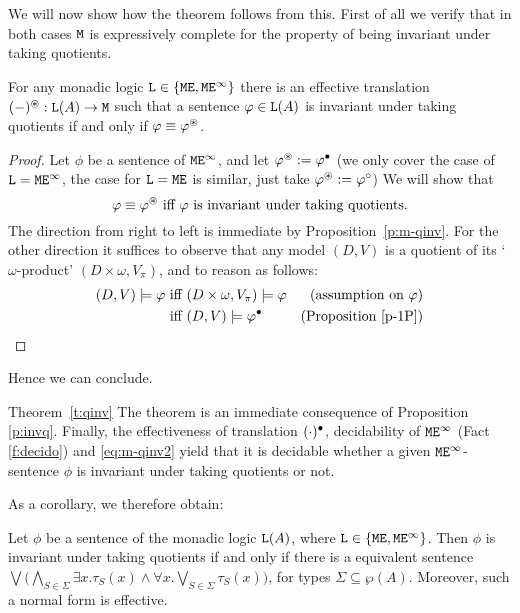 \noindent
We will now show how the theorem follows from this.
First of all we verify that  in both cases $\mathtt{M}$ is expressively complete
for the property of being invariant under taking quotients.

\begin{proposition} 
\label{p:invq}
For any monadic logic $\mathtt{L} \in \{ \mathtt{M}\mathtt{E}, \mathtt{M}\mathtt{E}^{\infty} \}$ there is an effective 
translation $(-)^\oast: \mathtt{L}(A) \to \mathtt{M}$ such that a sentence $\varphi \in
\mathtt{L}(A)$ is invariant under taking quotients if and only if
$\varphi\equiv \varphi^\oast$.
\end{proposition}
\begin{proof}
Let $\phi$ be a sentence of $\mathtt{M}\mathtt{E}^{\infty}$, and let $\varphi^\oast \mathrel{:=} \varphi^{\bullet}$ (we only cover the case of $\mathtt{L} = 
\mathtt{M}\mathtt{E}^{\infty}$, the case for $\mathtt{L} = \mathtt{M}\mathtt{E}$ is similar, just take $\varphi^\oast \mathrel{:=} \varphi^{\circ}$)
We will show that 
\begin{equation}
\label{eq:m-qinv2}
\varphi \equiv \varphi^{\oast} \text{ iff } \text{$\varphi$ is invariant under 
taking quotients}.
\end{equation}
The direction from right to left is immediate by Proposition~\ref{p:m-qinv}.
For the other direction it suffices to observe that any model $(D,V)$ is a 
quotient of its `$\omega$-product' $(D\times \omega, V_\pi)$, and to 
reason as follows:
\begin{align*}
(D,V) \models \varphi 
   & \text{ iff } (D\times \omega, V_\pi) \models \varphi
   & \text{(assumption on $\varphi$)}
\\ & \text{ iff } (D,V) \models \varphi^{\bullet}
   & \text{(Proposition~\ref{p-1P})}
\end{align*}

\end{proof}

Hence we can conclude.
\begin{proofof}{Theorem~\ref{t:qinv}}
The theorem is an immediate consequence of Proposition \ref{p:invq}.
Finally, the effectiveness of translation  $(\cdot)^{\bullet}$, decidability of $\mathtt{M}\mathtt{E}^{\infty}$ (Fact \ref{f:decido}) and \eqref{eq:m-qinv2} yield
that it is decidable whether a given $\mathtt{M}\mathtt{E}^{\infty}$-sentence $\phi$ is invariant under 
taking quotients or not.
\end{proofof}

As a corollary, we therefore obtain:

\begin{corollary}\label{cor:qinv}
Let $\phi$ be a sentence of the monadic logic $\mathtt{L}(A)$, where $\mathtt{L} \in 
\{ \mathtt{M}\mathtt{E}, \mathtt{M}\mathtt{E}^{\infty} \}$. Then $\phi$ is invariant under taking quotients if and only if there is a 
equivalent sentence $\bigvee \big(\bigwedge_{S\in\Sigma} \exists x. \tau_S(x) \land 
   \forall x. \bigvee_{S\in\Sigma} \tau_S(x)\big)$, for  types $\Sigma\subseteq \wp(A)$. Moreover, such a normal form is effective.
\end{corollary}

